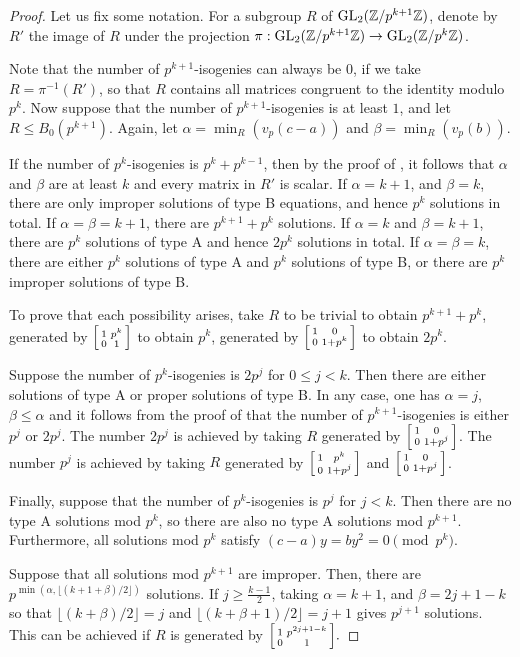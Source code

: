 \documentclass[10pt,leqno]{amsart}
\newcommand\sm[1]{\begin{bsmallmatrix}#1\end{bsmallmatrix}}
\newcommand{\Z}{\mathbb{Z}}
\newcommand{\GL}{\textnormal{GL}}
\theoremstyle{definition}
\theoremstyle{remark}
\numberwithin{theorem}{section}
\begin{document}
\begin{proof}
    Let us fix some notation. For a subgroup $R$ of $\GL_2(\Z/p^{k+1}\Z)$, denote by $R'$ the image of $R$ under the projection $\pi:\GL_2(\Z/p^{k+1}\Z)\to \GL_2(\Z/p^k\Z)$. 

    Note that the number of $p^{k+1}$-isogenies can always be $0$, if we take $R=\pi^{-1}(R')$, so that $R$ contains all matrices congruent to the identity modulo $p^k$. Now suppose that the number of $p^{k+1}$-isogenies is at least $1$, and let $R \leq B_0(p^{k+1})$. Again, let $\alpha=\min_R(v_p(c-a))$ and $\beta=\min_R(v_p(b)).$ 

    If the number of $p^k$-isogenies is $p^k+p^{k-1}$, then by the proof of , it follows that $\alpha$ and $\beta$ are at least $k$ and every matrix in $R'$ is scalar. If $\alpha=k+1$, and $\beta=k$, there are only improper solutions of type B equations, and hence $p^k$ solutions in total. If $\alpha=\beta=k+1$, there are $p^{k+1}+p^k$ solutions. If $\alpha=k$ and $\beta=k+1$, there are $p^k$ solutions of type A and hence $2p^k$ solutions in total. If $\alpha=\beta=k$, there are either $p^k$ solutions of type A and $p^k$ solutions of type B, or there are $p^k$ improper solutions of type B. 
    
    To prove that each possibility arises, take $R$ to be trivial to obtain $p^{k+1}+p^k$, generated by $\sm{1 & p^k \\ 0 & 1}$ to obtain $p^k$, generated by $\sm{1 & 0 \\ 0 & 1+p^k}$ to obtain $2p^k$.

    
    Suppose the number of $p^k$-isogenies is $2p^j$ for $0\leq j <k$. Then there are either solutions of type A or proper solutions of type B. In any case, one has $\alpha=j$, $\beta\leq \alpha$ and it follows from the proof of  that the number of $p^{k+1}$-isogenies is either $p^j$ or $2p^j$. The number $2p^j$ is achieved by taking $R$ generated by $\sm{1 & 0 \\ 0 & 1+p^j}$. The number $p^j$ is achieved by taking $R$ generated by $\sm{1 & p^k \\ 0 & 1+p^j}$ and $\sm{1 & 0 \\ 0 & 1+p^j}$.


    Finally, suppose that the number of $p^k$-isogenies is $p^j$ for $j<k$. Then there are no type A solutions mod $p^k$, so there are also no type A solutions mod $p^{k+1}$. Furthermore, all solutions mod $p^k$ satisfy $(c-a)y=by^2=0 \pmod {p^k}$. 
    
    Suppose that all solutions mod $p^{k+1}$ are improper. Then, there are $p^{\min(\alpha, \lfloor (k+1+\beta)/2 \rfloor)}$ solutions. If $j\geq \frac{k-1}{2}$, taking $\alpha=k+1$, and $\beta=2j+1-k$ so that $\lfloor (k+\beta)/2\rfloor=j$ and $\lfloor (k+\beta+1)/2\rfloor=j+1$ gives $p^{j+1}$ solutions. This can be achieved if $R$ is generated by $\sm{1 & p^{2j+1-k} \\ 0 & 1}.$  
    

\end{proof}
\end{document}
